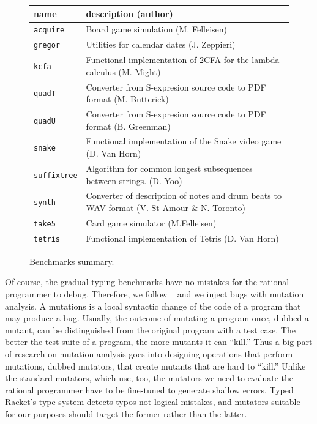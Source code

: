 \begin{figure}
\begin{tabular}{p{2cm} | p{10cm} }
  {\bf  name} & {\bf description (author)}  \\

\hline

  \texttt{acquire} & Board game simulation (M. Felleisen)  \\%


\hline
  \texttt{gregor} & Utilities for calendar dates (J. Zeppieri) \\%


\hline
  \texttt{kcfa} & Functional implementation of 2CFA for the lambda calculus (M. Might) \\%


\hline
  \texttt{quadT} & Converter from S-expresion source code to PDF format (M. Butterick)\\%
    
\hline
  \texttt{quadU} & Converter from S-expresion source code to PDF format  (B. Greenman) \\%

\hline
  \texttt{snake} & Functional implementation of the  Snake video game (D. Van Horn) \\%

\hline
  \texttt{suffixtree} & Algorithm for common longest subsequences between strings. (D. Yoo) \\%

\hline
  \texttt{synth} & Converter of description of notes and drum beats to WAV format (V. St-Amour \& N. Toronto) \\%

\hline
  \texttt{take5} & Card game simulator (M.Felleisen)  \\%

\hline
  \texttt{tetris} & Functional implementation of Tetris (D. Van Horn) \\%


\end{tabular}
  \caption{Benchmarks summary.}
  \label{table:benchmark-descriptions}
\end{figure}

Of course, the gradual typing benchmarks have no mistakes for the rational
programmer to debug. Therefore, we follow
~\citet{lksfd-popl-2020} and we inject bugs with mutation analysis. 
A mutations is a local syntactic change of the code of a program that may
produce a bug. Usually, the outcome of mutating a program
once, dubbed a mutant, can be distinguished from the original program with a test case. 
The better the test suite of a program, the more mutants it can ``kill.''
Thus a big part of research on mutation analysis goes into designing
operations that perform mutations, dubbed mutators, that create mutants 
that are hard to ``kill.'' Unlike the standard mutators, which \citet{lksfd-popl-2020}
use, too, the mutators we need to evaluate the rational programmer have to be
fine-tuned to generate shallow errors. Typed Racket's type system detects 
typos not logical mistakes, and mutators suitable for our purposes
should target the former rather than the latter. 

